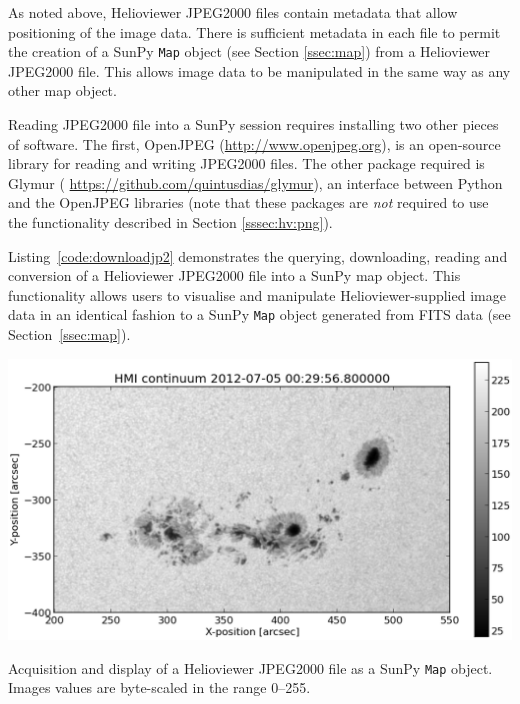 As noted above, Helioviewer JPEG2000 files contain metadata that allow
positioning of the image data.  There is sufficient metadata in each
file to permit the creation of a SunPy \texttt{Map} object (see Section
\ref{ssec:map}) from a Helioviewer JPEG2000 file.  This allows image
data to be manipulated in the same way as any other map object.

Reading JPEG2000 file into a SunPy session requires installing two
other pieces of software. The first, OpenJPEG
(\url{http://www.openjpeg.org}), is an open-source
library for reading and writing JPEG2000 files.  The other package 
required is Glymur (
\url{https://github.com/quintusdias/glymur}), an
interface between Python and the OpenJPEG libraries (note that these
packages are {\it not} required to use the functionality described in
Section \ref{sssec:hv:png}).

Listing~\ref{code:downloadjp2} demonstrates the querying, downloading,
reading and conversion of a Helioviewer JPEG2000 file into a SunPy map
object.  This functionality allows users to visualise and manipulate
Helioviewer-supplied image data in an identical fashion to a SunPy \texttt{Map}
object generated from FITS data (see Section~\ref{ssec:map}).

\begin{listing}[H]
\begin{center}
\includegraphics[width=0.8\columnwidth]{helioviewer_hmi_continuum_jp2_to_map}
\end{center}
\caption{Acquisition and display of a Helioviewer JPEG2000 file as a
  SunPy \texttt{Map} object. Images values are byte-scaled in the range 0--255.}
\label{code:downloadjp2}
\end{listing}
